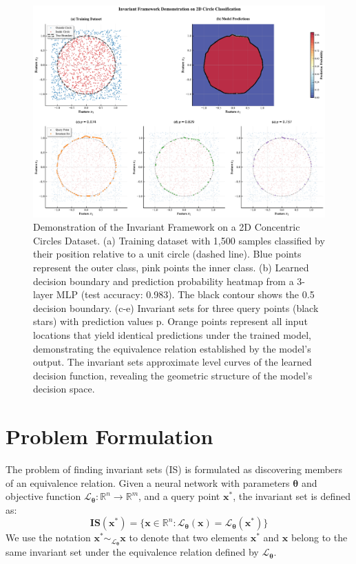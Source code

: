 \begin{figure}[h]
\centering
\includegraphics[width=\linewidth]{figures/main/invariant_framework_combined.pdf}
\caption{Demonstration of the Invariant Framework on a 2D Concentric Circles Dataset.
(a) Training dataset with 1,500 samples classified by their position relative to a unit circle (dashed line). Blue points represent the outer class, pink points the inner class.
(b) Learned decision boundary and prediction probability heatmap from a 3-layer MLP (test accuracy: 0.983). The black contour shows the 0.5 decision boundary.
(c-e) Invariant sets for three query points (black stars) with prediction values p. Orange points represent all input locations that yield identical predictions under the trained model, demonstrating the equivalence relation established by the model's output. The invariant sets approximate level curves of the learned decision function, revealing the geometric structure of the model's decision space.}
\label{fig:teaser}
\end{figure}

\section{Problem Formulation}
The problem of finding invariant sets (IS) is formulated as discovering members of an equivalence relation. Given a neural network with parameters $\boldsymbol{\theta}$ and objective function $\mathcal{L}_{\boldsymbol{\theta}}:\mathbb{R}^n \rightarrow \mathbb{R}^m$, and a query point $\mathbf{x^*}$, the invariant set is defined as:
\begin{equation}
  \mathbf{IS}(\mathbf{x^*}) = \{ \mathbf{x} \in \mathbb{R}^n : \mathcal{L}_{\boldsymbol{\theta}}(\mathbf{x}) = \mathcal{L}_{\boldsymbol{\theta}}(\mathbf{x^*}) \}
  \label{eq:is}
\end{equation}
We use the notation $\mathbf{x^*} \sim_{\mathcal{L}_{\boldsymbol{\theta}}} \mathbf{x}$ to denote that two elements $\mathbf{x^*}$ and $\mathbf{x}$ belong to the same invariant set under the equivalence relation defined by $\mathcal{L}_{\boldsymbol{\theta}}$.

